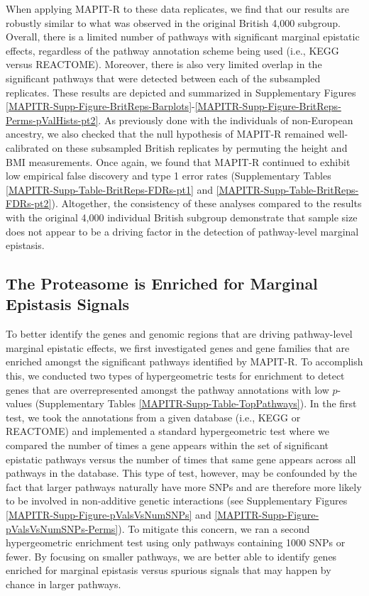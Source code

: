 \documentclass[10pt]{article}
\begin{document}
When applying MAPIT-R to these data replicates, we find that our results are robustly similar to what was observed in the original British 4,000 subgroup. Overall, there is a limited number of pathways with significant marginal epistatic effects, regardless of the pathway annotation scheme being used (i.e., KEGG versus REACTOME). Moreover, there is also very limited overlap in the significant pathways that were detected between each of the subsampled replicates. These results are depicted and summarized in Supplementary Figures \ref{MAPITR-Supp-Figure-BritReps-Barplots}-\ref{MAPITR-Supp-Figure-BritReps-Perms-pValHists-pt2}. As previously done with the individuals of non-European ancestry, we also checked that the null hypothesis of MAPIT-R remained well-calibrated on these subsampled British replicates by permuting the height and BMI measurements. Once again, we found that MAPIT-R continued to exhibit low empirical false discovery and type 1 error rates (Supplementary Tables \ref{MAPITR-Supp-Table-BritReps-FDRs-pt1} and \ref{MAPITR-Supp-Table-BritReps-FDRs-pt2}). Altogether, the consistency of these analyses compared to the results with the original 4,000 individual British subgroup demonstrate that sample size does not appear to be a driving factor in the detection of pathway-level marginal epistasis.

\subsection*{The Proteasome is Enriched for Marginal Epistasis Signals}

To better identify the genes and genomic regions that are driving pathway-level marginal epistatic effects, we first investigated genes and gene families that are enriched amongst the significant pathways identified by MAPIT-R. To accomplish this, we conducted two types of hypergeometric tests for enrichment to detect genes that are overrepresented amongst the pathway annotations with low $p$-values (Supplementary Tables \ref{MAPITR-Supp-Table-TopPathways}). In the first test, we took the annotations from a given database (i.e., KEGG or REACTOME) and implemented a standard hypergeometric test where we compared the number of times a gene appears within the set of significant epistatic pathways versus the number of times that same gene appears across all pathways in the database. This type of test, however, may be confounded by the fact that larger pathways naturally have more SNPs and are therefore more likely to be involved in non-additive genetic interactions (see Supplementary Figures \ref{MAPITR-Supp-Figure-pValsVsNumSNPs} and \ref{MAPITR-Supp-Figure-pValsVsNumSNPs-Perms}). To mitigate this concern, we ran a second hypergeometric enrichment test using only pathways containing 1000 SNPs or fewer. By focusing on smaller pathways, we are better able to identify genes enriched for marginal epistasis versus spurious signals that may happen by chance in larger pathways.
\end{document}

